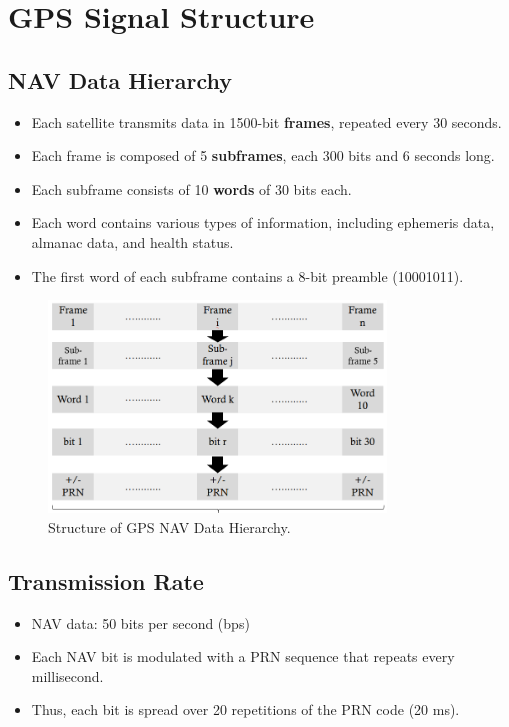 \documentclass[12pt]{report}
\begin{document}
\section{GPS Signal Structure}

\subsection{NAV Data Hierarchy}
\begin{itemize}
  \item Each satellite transmits data in 1500-bit \textbf{frames}, repeated every 30 seconds.
  \item Each frame is composed of 5 \textbf{subframes}, each 300 bits and 6 seconds long.
  \item Each subframe consists of 10 \textbf{words} of 30 bits each.
  \item Each word contains various types of information, including ephemeris data, almanac data, and health status.
  \item The first word of each subframe contains a 8-bit preamble (10001011).
\end{itemize}

\begin{figure}[H]
    \centering
    \includegraphics[width=0.8\textwidth]{GPS_struct.png}
    \caption{Structure of GPS NAV Data Hierarchy.}
    \label{fig:gps_struct}
\end{figure}

\subsection{Transmission Rate}
\begin{itemize}
  \item NAV data: 50 bits per second (bps)
  \item Each NAV bit is modulated with a PRN sequence that repeats every millisecond.
  \item Thus, each bit is spread over 20 repetitions of the PRN code (20 ms).
\end{itemize}
\end{document}
